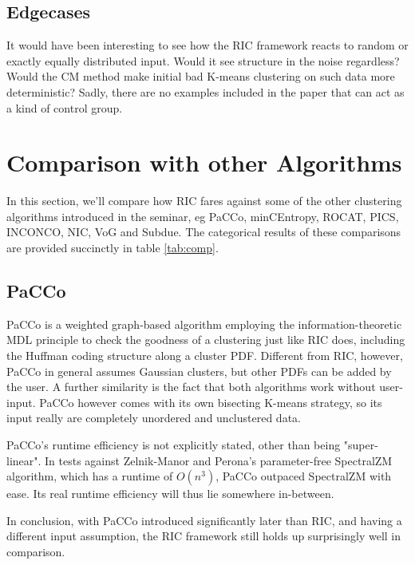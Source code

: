 \documentclass[conference]{IEEEtran}
\begin{document}
\subsection{Edgecases}
It would have been interesting to see how the RIC framework reacts to random or exactly equally distributed input. Would it see structure in the noise regardless? Would the CM method make initial bad K-means clustering on such data more deterministic? Sadly, there are no examples included in the paper that can act as a kind of control group.

\section{Comparison with other Algorithms}
\label{sec:comp}
In this section, we'll compare how RIC fares against some of the other clustering algorithms introduced in the seminar, eg PaCCo\cite{Mueller2011-hd}, minCEntropy\cite{Vinh2010-tc}, ROCAT\cite{He2014-uf}, PICS\cite{Akoglu2012-vz}, INCONCO\cite{Plant2011-wy}, NIC\cite{Faivishevsky2010-uk}, VoG\cite{Koutra2014-up} and Subdue\cite{Ketkar2005-zs}. The categorical results of these comparisons are provided succinctly in table \ref{tab:comp}.

\subsection{PaCCo}
PaCCo is a weighted graph-based algorithm employing the information-theoretic MDL principle to check the goodness of a clustering just like RIC does, including the Huffman coding structure along a cluster PDF. Different from RIC, however, PaCCo in general assumes Gaussian clusters, but other PDFs can be added by the user. A further similarity is the fact that both algorithms work without user-input. PaCCo however comes with its own bisecting K-means strategy, so its input really are completely unordered and unclustered data.

PaCCo's runtime efficiency is not explicitly stated, other than being "super-linear". In tests against Zelnik-Manor and Perona's parameter-free SpectralZM algorithm\cite{Zelnik-Manor2004-rx}, which has a runtime of $ O(n^3) $, PaCCo outpaced SpectralZM with ease. Its real runtime efficiency will thus lie somewhere in-between.

In conclusion, with PaCCo introduced significantly later than RIC, and having a different input assumption, the RIC framework still holds up surprisingly well in comparison.
\end{document}
